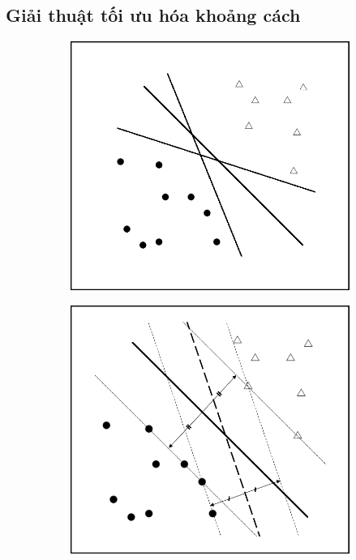 \subsection*{Giải thuật tối ưu hóa khoảng cách}
\begin{figure}[h] \centering
    \begin{subfigure}[b]{0.325\textwidth}    \centering
        \includegraphics[width=\textwidth]{hinh/SVM2.png}
        \caption{ }
        \label{fig:svm1}
    \end{subfigure}
    \begin{subfigure}[b]{0.325\textwidth}    \centering
        \includegraphics[width=\textwidth]{hinh/SVM3.png}

\end{subfigure}
\end{figure}
